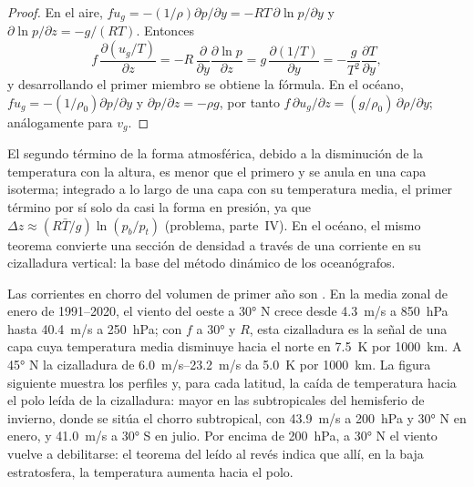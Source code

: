 \begin{proof}
En el aire, $fu_g = -(1/\rho)\partial p/\partial y = -RT\,\partial\ln
p/\partial y$ y $\partial\ln p/\partial z = -g/(RT)$. Entonces
\[
f\,\frac{\partial(u_g/T)}{\partial z} = -R\,\frac{\partial}{\partial y}\frac{\partial\ln p}{\partial z}
= g\,\frac{\partial(1/T)}{\partial y} = -\frac{g}{T^2}\frac{\partial T}{\partial y} ,
\]
y desarrollando el primer miembro se obtiene la fórmula. En el océano, $fu_g = -(1/\rho_0)\partial
p/\partial y$ y $\partial p/\partial z = -\rho g$, por tanto $f\,\partial u_g/
\partial z = (g/\rho_0)\,\partial\rho/\partial y$; análogamente para $v_g$.
\end{proof}

El segundo término de la forma atmosférica, debido a la disminución de la temperatura
con la altura, es menor que el primero y se anula en una capa isoterma;
integrado a lo largo de una capa con su temperatura media, el primer término
por sí solo da casi la forma en presión, ya que $\Delta z \approx (R\bar T/g)
\ln(p_b/p_t)$ (problema, parte~IV). En el océano, el mismo teorema convierte una
sección de densidad a través de una corriente en su cizalladura vertical: la base
del método dinámico de los oceanógrafos.


Las corrientes en chorro del volumen de primer año son . En la
media zonal de enero de 1991--2020, el viento del oeste a \ang{30} N crece desde
\qty{4.3}{m/s} a \qty{850}{hPa} hasta \qty{40.4}{m/s} a \qty{250}{hPa}; con
$f$ a \ang{30} y $R$, esta cizalladura es la señal de una capa cuya
temperatura media disminuye hacia el norte en \qty{7.5}{K} por \qty{1000}{km}. A \ang{45}
N la cizalladura de \qtyrange{6.0}{23.2}{m/s} da \qty{5.0}{K} por
\qty{1000}{km}. La figura siguiente muestra los perfiles y, para cada latitud,
la caída de temperatura hacia el polo leída de la cizalladura: mayor en las
subtropicales del hemisferio de invierno, donde se sitúa el
chorro subtropical, con \qty{43.9}{m/s} a \qty{200}{hPa} y \ang{30} N en enero, y
\qty{41.0}{m/s} a \ang{30} S en julio. Por encima de \qty{200}{hPa}, a \ang{30} N
el viento vuelve a debilitarse: el teorema del  leído al revés indica que
allí, en la baja estratosfera, la temperatura aumenta hacia el polo.

